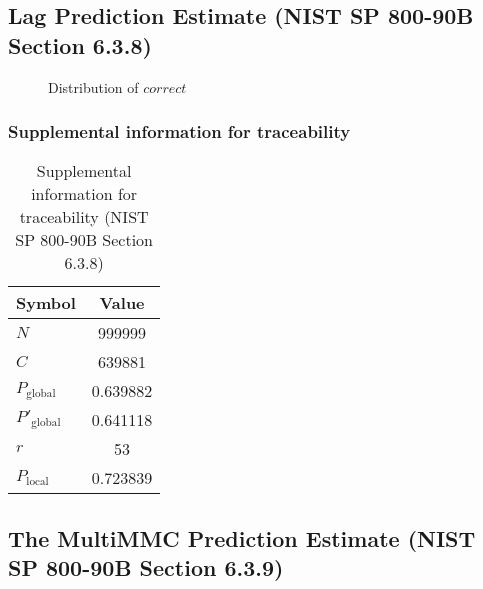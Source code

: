 \documentclass[a3paper,xelatex,english]{bxjsarticle}
\begin{document}
\subsection{Lag Prediction Estimate (NIST SP 800-90B Section 6.3.8)}\label{sec:NonBinary638}

\begin{figure}[htbp]
\centering

\caption{Distribution of $correct$}
\end{figure}
\subsubsection{Supplemental information for traceability}
\renewcommand{\arraystretch}{1.8}
\begin{table}[h]
\caption{Supplemental information for traceability (NIST SP 800-90B Section 6.3.8)}
\begin{center}
\begin{tabular}{|l|c|}
\hline 
\rowcolor{anotherlightblue} %
Symbol				& Value \\ \hline 
$N$				& 999999\\ \hline 
$C$				& 639881\\ \hline 
$P_{\textrm{global}}$				& 0.639882\\ \hline 
$P'_{\textrm{global}}$			& 0.641118\\ \hline 
$r$				& 53\\ \hline 
$P_{\textrm{local}}$ 			& 0.723839\\ \hline
\end{tabular}
\end{center}
\end{table}
\renewcommand{\arraystretch}{1.4}
\clearpage
\subsection{The MultiMMC Prediction Estimate (NIST SP 800-90B Section 6.3.9)}\label{sec:NonBinary639}
\end{document}
